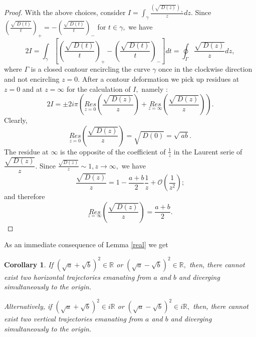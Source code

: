 \documentclass[12pt]{amsart}
\newtheorem{corollary}[theorem]{Corollary}
\begin{document}
\begin{proof}
With the above choices, consider $I=\int_{\gamma }\frac{\left( \sqrt{\
D\left( z\right) }\right) _{+}}{z}dz.$ Since $\left( \frac{\sqrt{\ D\left(
t\right) }}{t}\right) _{+}=-\left( \frac{\sqrt{\ D\left( t\right) }}{t}\right) _{-}$ for $t\in \gamma ,$ we have 
\begin{equation*}
2I=\int_{\gamma }\left[ \left( \frac{\sqrt{\ D\left( t\right) }}{t}\right)
_{+}-\left( \dfrac{\sqrt{\ D\left( t\right) }}{t}\right) _{-}\right]
dt=\oint_{\Gamma }\dfrac{\sqrt{\ D\left( z\right) }}{z}dz,
\end{equation*}where $\Gamma $ is a closed contour encircling the curve $\gamma $ once in
the clockwise direction and not encircling $z=0.$ After a contour
deformation we pick up residues at $z=0$ and at $z=\infty $ for the
calculation of $I,$ namely :\begin{equation*}
2I=\pm 2i\pi \left( \underset{z=0}{Res}\left( \dfrac{\sqrt{\ D\left(
z\right) }}{z}\right) +\underset{z=\infty }{Res}\left( \dfrac{\sqrt{\
D\left( z\right) }}{z}\right) \right) .
\end{equation*}Clearly, 
\begin{equation*}
\underset{z=0}{Res}\left( \dfrac{\sqrt{\ D\left( z\right) }}{z}\right) =\sqrt{\ D\left( 0\right) }=\sqrt{\ ab}.
\end{equation*}The residue at $\infty $ is the opposite of the coefficient of $\frac{1}{z}$
in the Laurent serie of $\dfrac{\sqrt{\ D\left( z\right) }}{z}.$ Since $\frac{\sqrt{D\left( z\right) }}{z}\sim 1,z\rightarrow \infty ,$ we have\begin{equation*}
\dfrac{\sqrt{\ D\left( z\right) }}{z}=1-\frac{a+b}{2}\frac{1}{z}+\mathcal{O}\left( \frac{1}{z^{2}}\right) ;
\end{equation*}and therefore 
\begin{equation*}
\underset{z=\infty }{Res}\left( \dfrac{\sqrt{\ D\left( z\right) }}{z}\right)
=\dfrac{a+b}{2}.
\end{equation*}
\end{proof}

As an immediate consequence of Lemma \ref{real} we get

\begin{corollary}
\label{2spirals2zeros} If $\left( \sqrt{a}+\sqrt{b}\right) ^{2}\in 
\mathbb{R}
$ or $\left( \sqrt{a}-\sqrt{b}\right) ^{2}\in 
\mathbb{R}
,$ then, there cannot exist two horizontal trajectories emanating from $a$
and $b$ and diverging simultaneously to the origin.

Alternatively, if $\left( \sqrt{a}+\sqrt{b}\right) ^{2}\in i\mathbb{R}
$ or $\left( \sqrt{a}-\sqrt{b}\right) ^{2}\in i\mathbb{R}
,$ then, there cannot exist two vertical trajectories emanating from $a$ and 
$b$ and diverging simultaneously to the origin.
\end{corollary}
\end{document}
